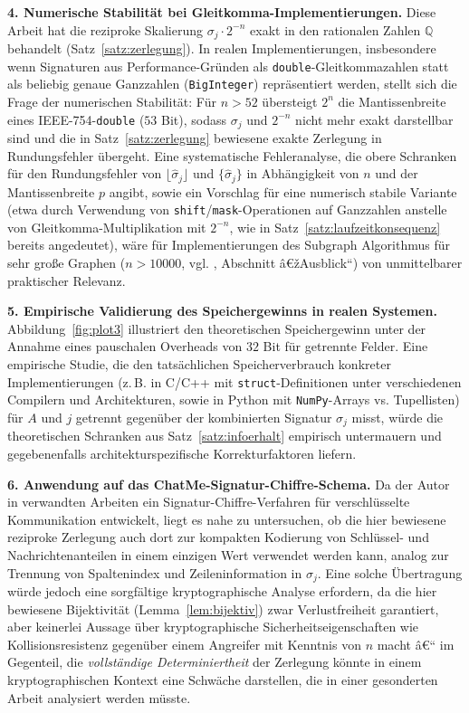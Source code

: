 ﻿\documentclass[a4paper,12pt]{article}
\theoremstyle{definition}
\begin{document}
\textbf{4. Numerische Stabilität bei Gleitkomma-Implementierungen.} Diese
Arbeit hat die reziproke Skalierung $\sigma_j\cdot2^{-n}$ exakt in den
rationalen Zahlen $\mathbb{Q}$ behandelt (Satz~\ref{satz:zerlegung}). In
realen Implementierungen, insbesondere wenn Signaturen aus
Performance-Gründen als \texttt{double}-Gleitkommazahlen statt als
beliebig genaue Ganzzahlen (\texttt{BigInteger}) repräsentiert werden,
stellt sich die Frage der numerischen Stabilität: Für $n > 52$ übersteigt
$2^n$ die Mantissenbreite eines IEEE-754-\texttt{double} ($53$ Bit), sodass
$\sigma_j$ und $2^{-n}$ nicht mehr exakt darstellbar sind und die in
Satz~\ref{satz:zerlegung} bewiesene exakte Zerlegung in Rundungsfehler
übergeht. Eine systematische Fehleranalyse, die obere Schranken für den
Rundungsfehler von $\lfloor\hat\sigma_j\rfloor$ und $\{\hat\sigma_j\}$ in
Abhängigkeit von $n$ und der Mantissenbreite $p$ angibt, sowie ein
Vorschlag für eine numerisch stabile Variante (etwa durch Verwendung von
\texttt{shift}/\texttt{mask}-Operationen auf Ganzzahlen anstelle von
Gleitkomma-Multiplikation mit $2^{-n}$, wie in
Satz~\ref{satz:laufzeitkonsequenz} bereits angedeutet), wäre für
Implementierungen des Subgraph Algorithmus für sehr große Graphen
($n>10000$, vgl. \cite{epp2026subgraph}, Abschnitt â€žAusblick``) von
unmittelbarer praktischer Relevanz.

\textbf{5. Empirische Validierung des Speichergewinns in realen
Systemen.} Abbildung~\ref{fig:plot3} illustriert den theoretischen
Speichergewinn unter der Annahme eines pauschalen Overheads von $32$ Bit
für getrennte Felder. Eine empirische Studie, die den tatsächlichen
Speicherverbrauch konkreter Implementierungen (z.\,B. in C/C++ mit
\texttt{struct}-Definitionen unter verschiedenen Compilern und
Architekturen, sowie in Python mit \texttt{NumPy}-Arrays vs. Tupellisten)
für $A$ und $j$ getrennt gegenüber der kombinierten Signatur $\sigma_j$
misst, würde die theoretischen Schranken aus
Satz~\ref{satz:infoerhalt} empirisch untermauern und gegebenenfalls
architekturspezifische Korrekturfaktoren liefern.

\textbf{6. Anwendung auf das ChatMe-Signatur-Chiffre-Schema.} Da der
Autor in verwandten Arbeiten ein Signatur-Chiffre-Verfahren für
verschlüsselte Kommunikation entwickelt, liegt es nahe zu untersuchen, ob
die hier bewiesene reziproke Zerlegung auch dort zur kompakten Kodierung
von Schlüssel- und Nachrichtenanteilen in einem einzigen Wert verwendet
werden kann, analog zur Trennung von Spaltenindex und Zeileninformation in
$\sigma_j$. Eine solche Übertragung würde jedoch eine sorgfältige
kryptographische Analyse erfordern, da die hier bewiesene Bijektivität
(Lemma~\ref{lem:bijektiv}) zwar Verlustfreiheit garantiert, aber keinerlei
Aussage über kryptographische Sicherheitseigenschaften wie
Kollisionsresistenz gegenüber einem Angreifer mit Kenntnis von $n$ macht â€“
im Gegenteil, die \emph{vollständige Determiniertheit} der Zerlegung könnte
in einem kryptographischen Kontext eine Schwäche darstellen, die in einer
gesonderten Arbeit analysiert werden müsste.
\end{document}
